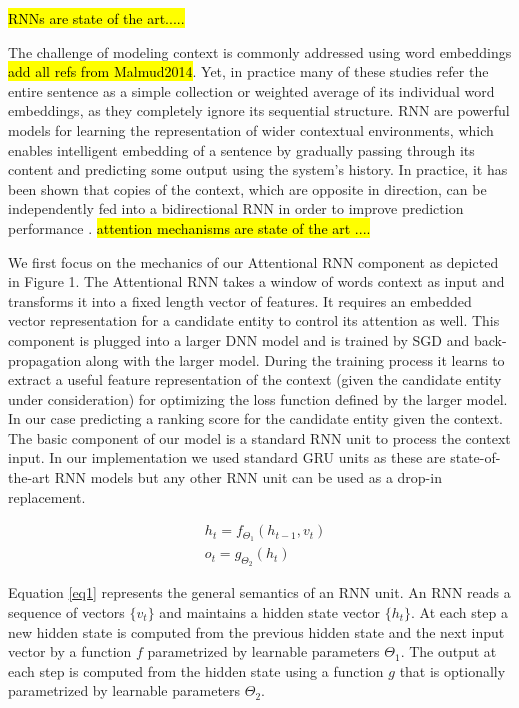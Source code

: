 \documentclass[11pt]{article}
\begin{document}
	\hl{RNNs are state of the art..... }
	
	The challenge of modeling context is commonly addressed using word embeddings \cite{} \hl{add all refs from Malmud2014}. Yet, in practice many of these studies refer the entire sentence as a simple collection or weighted average of its individual word embeddings, as they completely ignore its sequential structure. RNN are powerful models for learning the representation of wider contextual environments, which enables intelligent embedding of a sentence by gradually passing through its content and predicting some output using the system's history. In practice, it has been shown that copies of the context, which are opposite in direction, can be independently fed into a bidirectional RNN in order to improve prediction performance \cite{Munich2004c,Melamud2014a}. 
	\hl{attention mechanisms are state of the art ....}
	
	We first focus on the mechanics of our Attentional RNN component as depicted in Figure 1. The Attentional RNN takes a window of words context as input and transforms it into a fixed length vector of features. It requires an embedded vector representation for a candidate entity to control its attention as well. This component is plugged into a larger DNN model and is trained by SGD and back-propagation along with the larger model. During the training process it learns to extract a useful feature representation of the context (given the candidate entity under consideration) for optimizing the loss function defined by the larger model. In our case predicting a ranking score for the candidate entity given the context.
	The basic component of our model is a standard RNN unit to process the context input. In our implementation we used standard GRU units \cite{cho2014learning} as these are state-of-the-art RNN models but any other RNN unit can be used as a drop-in replacement. 
	
	\begin{equation}
	\label{eq1}
	\begin{aligned}
	& h_t=f_{\Theta_1}(h_{t-1}, v_t) \\
	& o_t=g_{\Theta_2}(h_t)
	\end{aligned}
	\end{equation}
	
	Equation \ref{eq1} represents the general semantics of an RNN unit. An RNN reads a sequence of vectors $\{v_t\}$ and maintains a hidden state vector $\{h_t\}$. At each step a new hidden state is computed from the previous hidden state and the next input vector by a function $f$ parametrized by learnable parameters $\Theta_1$. The output at each step is computed from the hidden state using a function $g$ that is optionally parametrized by learnable parameters $\Theta_2$. 
	
\end{document}

